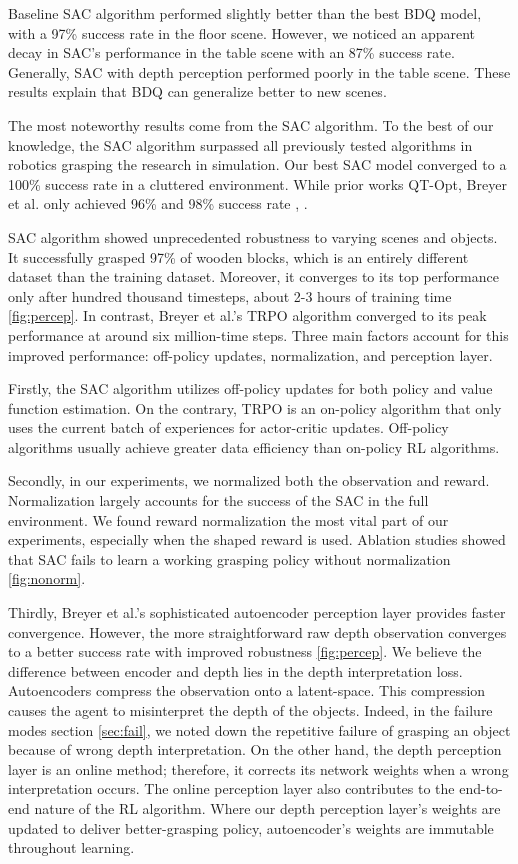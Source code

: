 Baseline SAC algorithm performed slightly better than the best BDQ model, with a 97\% success rate in the floor scene. However, we noticed an apparent decay in SAC's performance in the table scene with an 87\% success rate. Generally, SAC with depth perception performed poorly in the table scene. These results explain that BDQ can generalize better to new scenes.

The most noteworthy results come from the SAC algorithm. To the best of our knowledge, the SAC algorithm surpassed all previously tested algorithms in robotics grasping the research in simulation. Our best SAC model converged to a 100\% success rate in a cluttered environment. While prior works QT-Opt, Breyer et al. only achieved 96\% and 98\% success rate \cite{Kalashnikov2018}, \cite{Quillen2018}. 

SAC algorithm showed unprecedented robustness to varying scenes and objects. It successfully grasped 97\% of wooden blocks, which is an entirely different dataset than the training dataset. Moreover, it converges to its top performance only after hundred thousand timesteps, about 2-3 hours of training time \ref{fig:percep}. In contrast, Breyer et al.'s TRPO algorithm converged to its peak performance at around six million-time steps. Three main factors account for this improved performance: off-policy updates, normalization, and perception layer. 

Firstly, the SAC algorithm utilizes off-policy updates for both policy and value function estimation. On the contrary, TRPO is an on-policy algorithm that only uses the current batch of experiences for actor-critic updates. Off-policy algorithms usually achieve greater data efficiency than on-policy RL algorithms.

Secondly, in our experiments, we normalized both the observation and reward. Normalization largely accounts for the success of the SAC in the full environment. We found reward normalization the most vital part of our experiments, especially when the shaped reward is used. Ablation studies showed that SAC fails to learn a working grasping policy without normalization \ref{fig:nonorm}.

Thirdly, Breyer et al.'s sophisticated autoencoder perception layer provides faster convergence. However, the more straightforward raw depth observation converges to a better success rate with improved robustness \ref{fig:percep}. We believe the difference between encoder and depth lies in the depth interpretation loss. Autoencoders compress the observation onto a latent-space. This compression causes the agent to misinterpret the depth of the objects. Indeed, in the failure modes section \ref{sec:fail}, we noted down the repetitive failure of grasping an object because of wrong depth interpretation. On the other hand, the depth perception layer is an online method; therefore, it corrects its network weights when a wrong interpretation occurs. The online perception layer also contributes to the end-to-end nature of the RL algorithm. Where our depth perception layer's weights are updated to deliver better-grasping policy, autoencoder's weights are immutable throughout learning.

